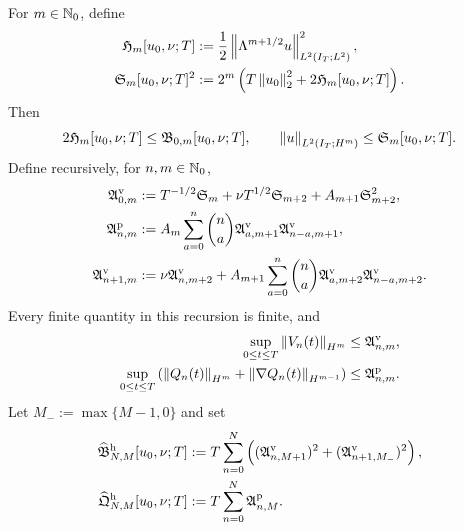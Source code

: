 \begin{proposition}
\label{prop:qc-critical-height-row-propagation}
For \(m\in\mathbb N_0\), define
\begin{align}
 \mathfrak H_m[u_0,\nu;T]
 &:={}
 \frac12\left\lVert \Lambda^{m+1/2}u\right\rVert_{L^2(I_T;L^2)}^2,
 \label{eq:qc-height-producer-coordinate}\\
 \mathfrak S_m[u_0,\nu;T]^2
 &:={}
 2^m\left(T\left\lVert u_0\right\rVert_2^2+2\mathfrak H_m[u_0,\nu;T]\right).
 \label{eq:qc-spatial-row-from-height}
\end{align}
Then
\begin{equation}
 2\mathfrak H_m[u_0,\nu;T]
 \le\mathfrak B_{0,m}[u_0,\nu;T],
 \qquad
 \left\lVert u\right\rVert_{L^2(I_T;H^m)}\le\mathfrak S_m[u_0,\nu;T].
 \label{eq:qc-height-spatial-bounds}
\end{equation}
Define recursively, for \(n,m\in\mathbb N_0\),
\begin{align}
 \mathfrak A^{\rm v}_{0,m}
 &:={}
 T^{-1/2}\mathfrak S_m
 +\nu T^{1/2}\mathfrak S_{m+2}
 +A_{m+1}\mathfrak S_{m+2}^2,
 \label{eq:qc-height-base-pointwise-majorant}\\
 \mathfrak A^{\rm p}_{n,m}
 &:={}
 A_m\sum_{a=0}^{n}\binom na
 \mathfrak A^{\rm v}_{a,m+1}
 \mathfrak A^{\rm v}_{n-a,m+1},
 \label{eq:qc-height-pressure-majorant}\\
 \mathfrak A^{\rm v}_{n+1,m}
 &:={}
 \nu\mathfrak A^{\rm v}_{n,m+2}
 +A_{m+1}\sum_{a=0}^{n}\binom na
 \mathfrak A^{\rm v}_{a,m+2}
 \mathfrak A^{\rm v}_{n-a,m+2}.
 \label{eq:qc-height-temporal-majorant}
\end{align}
Every finite quantity in this recursion is finite, and
\begin{align}
 \sup_{0\le t\le T}\left\lVert V_n(t)\right\rVert_{H^m}
 &\le\mathfrak A^{\rm v}_{n,m},
 \label{eq:qc-height-temporal-row-bound}\\
 \sup_{0\le t\le T}
 \left(\left\lVert Q_n(t)\right\rVert_{H^m}
 +\left\lVert \nabla Q_n(t)\right\rVert_{H^{m-1}}\right)
 &\le\mathfrak A^{\rm p}_{n,m}.
 \label{eq:qc-height-pressure-row-bound}
\end{align}
Let \(M_-:=\max\{M-1,0\}\) and set
\begin{align}
 \widehat{\mathfrak B}_{N,M}^{\rm h}[u_0,\nu;T]
 &:={}
 T\sum_{n=0}^{N}\left(
 (\mathfrak A^{\rm v}_{n,M+1})^2
 +(\mathfrak A^{\rm v}_{n+1,M_-})^2
 \right),
 \label{eq:qc-height-reconstructed-rectangle}\\
 \widehat{\mathfrak Q}_{N,M}^{\rm h}[u_0,\nu;T]
 &:={}
 T\sum_{n=0}^{N}\mathfrak A^{\rm p}_{n,M}.
 \label{eq:qc-height-reconstructed-pressure}
\end{align}

\end{proposition}
